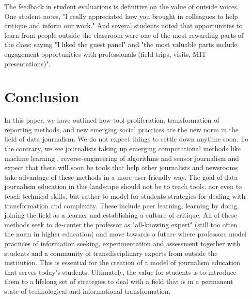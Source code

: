 \documentclass{acm_proc_article-sp}
\begin{document}
The feedback in student evaluations is definitive on the value of outside voices. One student notes, "I really appreciated how you brought in colleagues to help critique and inform our work." And several students noted that opportunities to learn from people outside the classroom were one of the most rewarding parts of the class; saying "I liked the guest panel" and "the most valuable parts include engagement opportunities with professionals (field trips, visits, MIT presentations)".

\section{Conclusion}

In this paper, we have outlined how tool proliferation, transformation of reporting methods, and new emerging social practices are the new norm in the field of data journalism. We do not expect things to settle down anytime soon. To the contrary, we see journalists taking up emerging computational methods like machine learning \cite{bhatia_how_2015}, reverse-engineering of algorithms \cite{diakopoulos_algorithmic_2015} and sensor journalism \cite{pitt_sensors_2014} and expect that there will soon be tools that help other journalists and newsrooms take advantage of these methods in a more user-friendly way. The goal of data journalism education in this landscape should not be to teach tools, nor even to teach technical skills, but rather to model for students strategies for dealing with transformation and complexity. These include peer learning, learning by doing, joining the field as a learner and establishing a culture of critique. All of these methods seek to de-center the professor as "all-knowing expert" (still too often the norm in higher education) and move towards a future where professors model practices of information seeking, experimentation and assessment together with students and a community of transdisciplinary experts from outside the institution. This is essential for the creation of a model of journalism education that serves today's students. Ultimately, the value for students is to introduce them to a lifelong set of strategies to deal with a field that is in a permanent state of technological and informational transformation.




\end{document}
